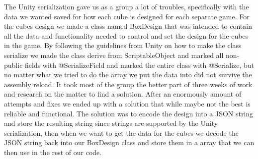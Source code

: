 The Unity serialization gave us as a group a lot of troubles, specifically with the data we wanted saved for how each cube is designed for each separate game.
For the cubes design we made a class named BoxDesign that was intended to contain all the data and functionality needed to control and set the design for the cubes in the game.
By following the guidelines from Unity on how to make the class serialize we made the class derive from ScriptableObject and marked all non-public fields with @SerializeField and marked the entire class with @Serialize, but no matter what we tried to do the array we put the data into did not survive the assembly reload.
It took most of the group the better part of three weeks of work and research on the matter to find a solution.
 After an enormously amount of attempts and fixes we ended up with a solution that while maybe not the best is reliable and functional. The solution was to encode the design into a JSON string and store the resulting string since strings are supported by the Unity serialization, then when we want to get the data for the cubes we decode the JSON string back into our BoxDesign class and store them in a array that we can then use in the rest of our code.
 